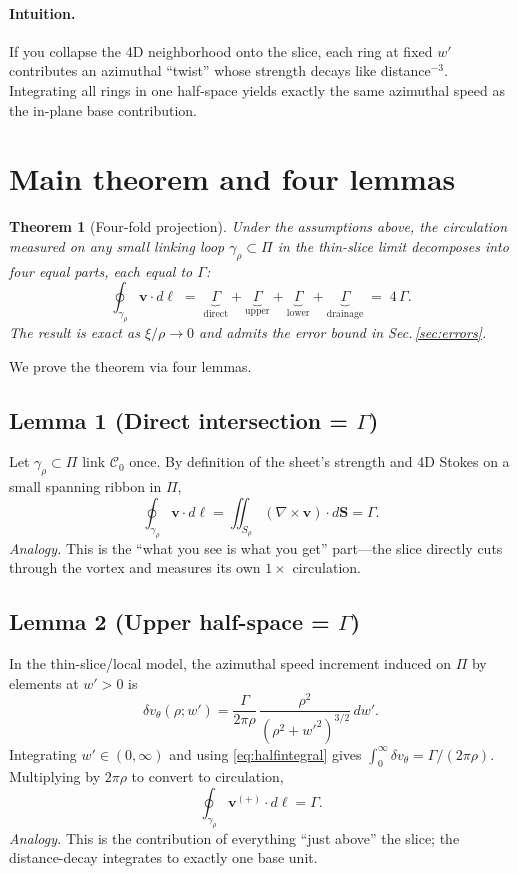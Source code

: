 \documentclass[11pt]{article}
\newtheorem{theorem}{Theorem}
\begin{document}
\paragraph{Intuition.} If you collapse the 4D neighborhood onto the slice, each ring at fixed $w'$ contributes an azimuthal ``twist'' whose strength decays like distance$^{-3}$. Integrating all rings in one half-space yields exactly the same azimuthal speed as the in-plane base contribution.

\section{Main theorem and four lemmas}
\begin{theorem}[Four-fold projection]
Under the assumptions above, the circulation measured on any small linking loop $\gamma_\rho\subset\Pi$ in the thin-slice limit decomposes into four equal parts, each equal to $\Gamma$:
\[
\oint_{\gamma_\rho}\bm v\cdot d\bm\ell\;=\;\underbrace{\Gamma}_{\text{direct}}+\underbrace{\Gamma}_{\text{upper}}+\underbrace{\Gamma}_{\text{lower}}+\underbrace{\Gamma}_{\text{drainage}}\;=\;4\,\Gamma.
\]
The result is exact as $\xi/\rho\to0$ and admits the error bound in Sec.\,\ref{sec:errors}.
\end{theorem}

We prove the theorem via four lemmas.

\subsection*{Lemma 1 (Direct intersection = $\Gamma$)}
Let $\gamma_\rho\subset\Pi$ link $\mathcal C_0$ once. By definition of the sheet’s strength and 4D Stokes on a small spanning ribbon in $\Pi$,
\[
\oint_{\gamma_\rho}\bm v\cdot d\bm\ell = \iint_{S_\rho}(\nabla\times\bm v)\cdot d\bm S=\Gamma.
\]
\textit{Analogy.} This is the ``what you see is what you get'' part—the slice directly cuts through the vortex and measures its own $1\times$ circulation.

\subsection*{Lemma 2 (Upper half-space = $\Gamma$)}
In the thin-slice/local model, the azimuthal speed increment induced on $\Pi$ by elements at $w'>0$ is
\[
\delta v_\theta(\rho;w')=\frac{\Gamma}{2\pi\rho}\,\frac{\rho^2}{(\rho^2+w'^2)^{3/2}}\,dw'.
\]
Integrating $w'\in(0,\infty)$ and using \eqref{eq:halfintegral} gives $\int_0^{\infty}\delta v_\theta=\Gamma/(2\pi\rho)$. Multiplying by $2\pi\rho$ to convert to circulation,
\[
\oint_{\gamma_\rho}\bm v^{(+)}\cdot d\bm\ell = \Gamma.
\]
\textit{Analogy.} This is the contribution of everything ``just above'' the slice; the distance-decay integrates to exactly one base unit.
\end{document}

